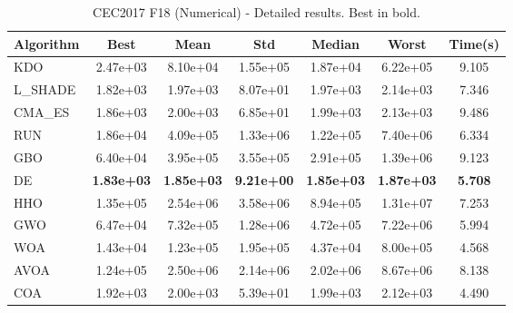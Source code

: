 \begin{table}[H]
\centering\small
\caption{CEC2017 F18 (Numerical) - Detailed results. Best in bold.}
\label{tab:cec2017_F18}
\begin{tabular}{lcccccc}
\toprule
\textbf{Algorithm} & \textbf{Best} & \textbf{Mean} & \textbf{Std} & \textbf{Median} & \textbf{Worst} & \textbf{Time(s)} \\
\midrule
KDO & 2.47e+03 & 8.10e+04 & 1.55e+05 & 1.87e+04 & 6.22e+05 & 9.105 \\
L_SHADE & 1.82e+03 & 1.97e+03 & 8.07e+01 & 1.97e+03 & 2.14e+03 & 7.346 \\
CMA_ES & 1.86e+03 & 2.00e+03 & 6.85e+01 & 1.99e+03 & 2.13e+03 & 9.486 \\
RUN & 1.86e+04 & 4.09e+05 & 1.33e+06 & 1.22e+05 & 7.40e+06 & 6.334 \\
GBO & 6.40e+04 & 3.95e+05 & 3.55e+05 & 2.91e+05 & 1.39e+06 & 9.123 \\
DE & \textbf{1.83e+03} & \textbf{1.85e+03} & \textbf{9.21e+00} & \textbf{1.85e+03} & \textbf{1.87e+03} & \textbf{5.708} \\
HHO & 1.35e+05 & 2.54e+06 & 3.58e+06 & 8.94e+05 & 1.31e+07 & 7.253 \\
GWO & 6.47e+04 & 7.32e+05 & 1.28e+06 & 4.72e+05 & 7.22e+06 & 5.994 \\
WOA & 1.43e+04 & 1.23e+05 & 1.95e+05 & 4.37e+04 & 8.00e+05 & 4.568 \\
AVOA & 1.24e+05 & 2.50e+06 & 2.14e+06 & 2.02e+06 & 8.67e+06 & 8.138 \\
COA & 1.92e+03 & 2.00e+03 & 5.39e+01 & 1.99e+03 & 2.12e+03 & 4.490 \\
\bottomrule
\end{tabular}
\end{table}
